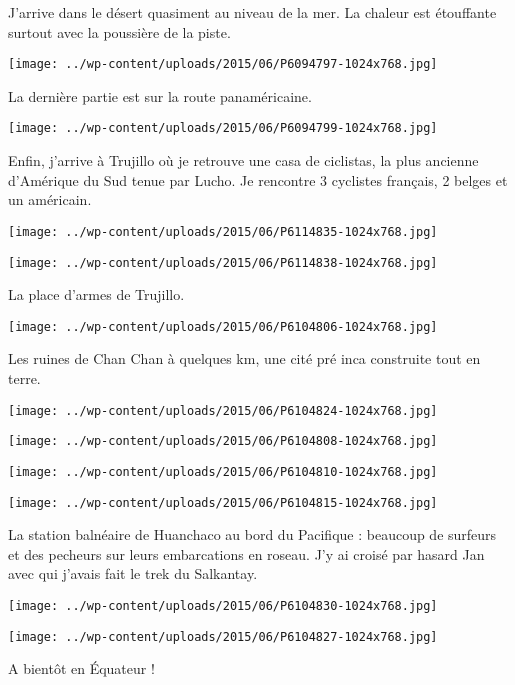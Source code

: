 J'arrive dans le désert quasiment au niveau de la mer. La chaleur est étouffante surtout avec la poussière de la piste. 
\begin{center} \texttt{[image: ../wp-content/uploads/2015/06/P6094797-1024x768.jpg]} \end{center}

La dernière partie est sur la route panaméricaine. 
\begin{center} \texttt{[image: ../wp-content/uploads/2015/06/P6094799-1024x768.jpg]} \end{center}
\pagebreak

Enfin, j'arrive à Trujillo où je retrouve une casa de ciclistas, la plus ancienne d'Amérique du Sud tenue par Lucho. Je rencontre 3 cyclistes français, 2 belges et un américain. 
\begin{center} \texttt{[image: ../wp-content/uploads/2015/06/P6114835-1024x768.jpg]} \end{center}
\begin{center} \texttt{[image: ../wp-content/uploads/2015/06/P6114838-1024x768.jpg]} \end{center}
\pagebreak

La place d'armes de Trujillo. 
\begin{center} \texttt{[image: ../wp-content/uploads/2015/06/P6104806-1024x768.jpg]} \end{center}

Les ruines de Chan Chan à quelques km, une cité pré inca construite tout en terre. 
\begin{center} \texttt{[image: ../wp-content/uploads/2015/06/P6104824-1024x768.jpg]} \end{center}
\begin{center} \texttt{[image: ../wp-content/uploads/2015/06/P6104808-1024x768.jpg]} \end{center}
\begin{center} \texttt{[image: ../wp-content/uploads/2015/06/P6104810-1024x768.jpg]} \end{center}
\begin{center} \texttt{[image: ../wp-content/uploads/2015/06/P6104815-1024x768.jpg]} \end{center}

La station balnéaire de Huanchaco au bord du Pacifique : beaucoup de surfeurs et des pecheurs sur leurs embarcations en roseau. J'y ai croisé par hasard Jan avec qui j'avais fait le trek du Salkantay. 
\begin{center} \texttt{[image: ../wp-content/uploads/2015/06/P6104830-1024x768.jpg]} \end{center}
\begin{center} \texttt{[image: ../wp-content/uploads/2015/06/P6104827-1024x768.jpg]} \end{center}

A bientôt en Équateur !
 